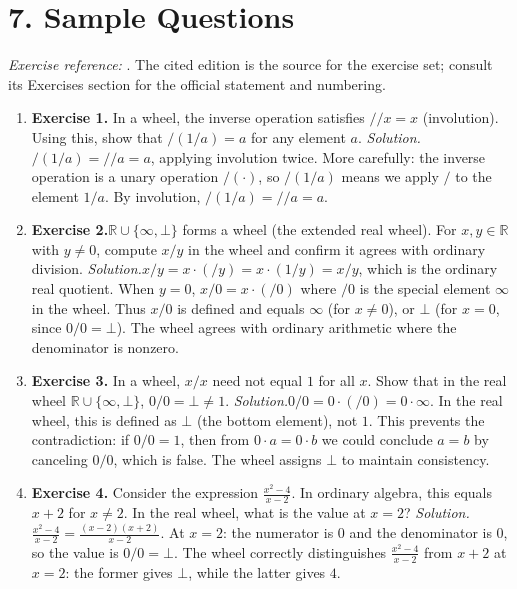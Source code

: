 \section*{7. Sample Questions}
\emph{Exercise reference:} \cite{wheel_ref1}. The cited edition is the source for the exercise set; consult its Exercises section for the official statement and numbering.
\begin{enumerate}[leftmargin=*,itemsep=0.9em]
\item \textbf{Exercise 1.} In a wheel, the inverse operation satisfies $//x = x$ (involution). Using this, show that $/(1/a) = a$ for any element $a$. \emph{Solution.}$/(1/a) = //a = a$, applying involution twice. More carefully: the inverse operation is a unary operation $/(\cdot)$, so $/(1/a)$ means we apply $/$ to the element $1/a$. By involution, $/(1/a) = //a = a$.

\item \textbf{Exercise 2.}$\mathbb{R} \cup \{\infty, \bot\}$ forms a wheel (the extended real wheel). For $x, y \in \mathbb{R}$ with $y \neq 0$, compute $x/y$ in the wheel and confirm it agrees with ordinary division. \emph{Solution.}$x/y = x \cdot (/y) = x \cdot (1/y) = x/y$, which is the ordinary real quotient. When $y = 0$, $x/0 = x \cdot (/0)$ where $/0$ is the special element $\infty$ in the wheel. Thus $x/0$ is defined and equals $\infty$ (for $x \neq 0$), or $\bot$ (for $x = 0$, since $0/0 = \bot$). The wheel agrees with ordinary arithmetic where the denominator is nonzero.

\item \textbf{Exercise 3.} In a wheel, $x/x$ need not equal $1$ for all $x$. Show that in the real wheel $\mathbb{R} \cup \{\infty, \bot\}$, $0/0 = \bot \neq 1$. \emph{Solution.}$0/0 = 0 \cdot (/0) = 0 \cdot \infty$. In the real wheel, this is defined as $\bot$ (the bottom element), not $1$. This prevents the contradiction: if $0/0 = 1$, then from $0 \cdot a = 0 \cdot b$ we could conclude $a = b$ by canceling $0/0$, which is false. The wheel assigns $\bot$ to maintain consistency.

\item \textbf{Exercise 4.} Consider the expression $\frac{x^2 - 4}{x - 2}$. In ordinary algebra, this equals $x + 2$ for $x \neq 2$. In the real wheel, what is the value at $x = 2$? \emph{Solution.}$\frac{x^2 - 4}{x - 2} = \frac{(x-2)(x+2)}{x - 2}$. At $x = 2$: the numerator is $0$ and the denominator is $0$, so the value is $0/0 = \bot$. The wheel correctly distinguishes $\frac{x^2-4}{x-2}$ from $x + 2$ at $x = 2$: the former gives $\bot$, while the latter gives $4$.


\end{enumerate}
